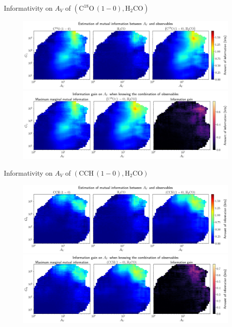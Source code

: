\documentclass{beamer}
\begin{document}
\begin{frame}{Informativity on $A_V$ of $\left(\mathrm{C^{18}O\,(1-0)},\mathrm{H_2CO}\right)$}
    \begin{figure}
        \centering
        \includegraphics[width=0.95\linewidth]{../mi/av__c18o10_h2co_mi.png}
        \vfill
        \includegraphics[width=0.95\linewidth]{../mi/av__c18o10_h2co_mi_gain.png}
    \end{figure}
\end{frame}

\begin{frame}{Informativity on $A_V$ of $\left(\mathrm{CCH\,(1-0)},\mathrm{H_2CO}\right)$}
    \begin{figure}
        \centering
        \includegraphics[width=0.95\linewidth]{../mi/av__cch10_h2co_mi.png}
        \vfill
        \includegraphics[width=0.95\linewidth]{../mi/av__cch10_h2co_mi_gain.png}
    \end{figure}
\end{frame}
\end{document}
